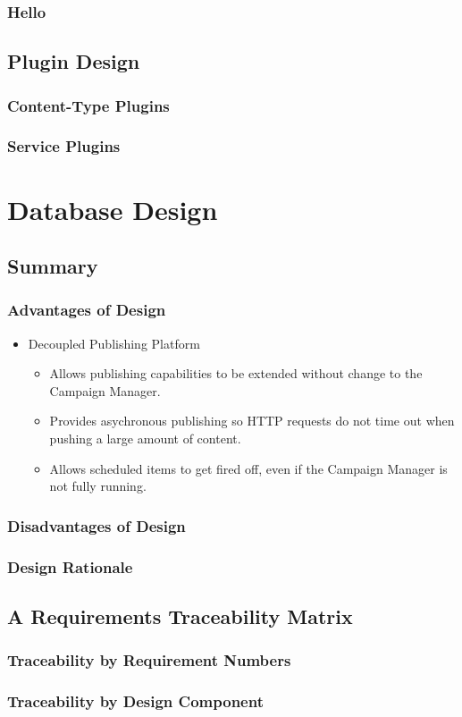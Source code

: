 \documentclass{report}
\begin{document}
		\subsection{Hello}

	\section{Plugin Design}
		\subsection{Content-Type Plugins}
		\subsection{Service Plugins}

\chapter{Database Design}
\section{Summary}
\subsection{Advantages of Design}
\begin{itemize}
\item Decoupled Publishing Platform
  \begin{itemize}
  \item Allows publishing capabilities to be extended without change to the Campaign Manager.
  \item Provides asychronous publishing so HTTP requests do not time out when pushing a large amount of content.
  \item Allows scheduled items to get fired off, even if the Campaign Manager is not fully running.
  \end{itemize}
\end{itemize}
\subsection{Disadvantages of Design}
\subsection{Design Rationale}
\section{A Requirements Traceability Matrix}
\subsection{Traceability by Requirement Numbers}
\subsection{Traceability by Design Component}
\end{document}
